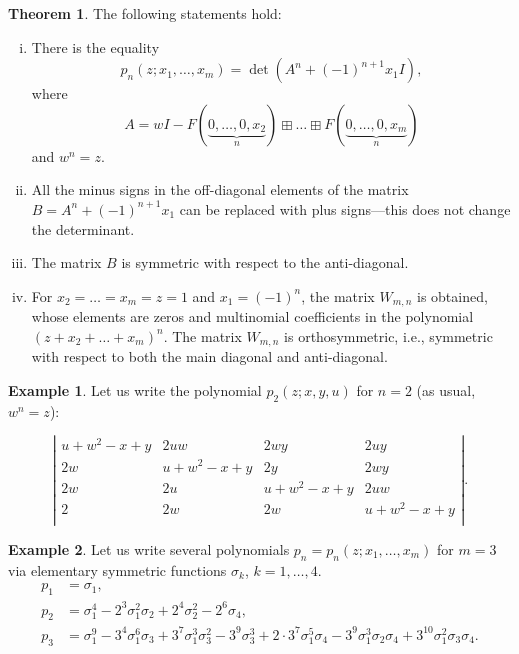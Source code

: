 \documentclass[14pt, dvipsnames]{extarticle}
\theoremstyle{definition}
\newtheorem{theorem}{Theorem}
\theoremstyle{definition}
\newtheorem{example}{\bf Example}
\theoremstyle{remark}
\begin{document}
\begin{theorem}\label{p_n_via_A^n}
The following statements hold:

\begin{enumerate}[(i)]

\item There is the equality $$p_n(z; x_1, \dots, x_m) = \det(A^n + (-1)^{n+1}x_1I),$$ where $$A = wI - F(\underset{n}{\underbrace{0,\dots,0, x_2}})\boxplus \dots\boxplus F(\underset{n}{\underbrace{0,\dots,0, x_m}})$$ and $w^n = z$. 

\item All the minus signs in the off-diagonal elements of the matrix $B = A^n + (-1)^{n+1}x_1$ can be replaced with plus signs—this does not change the determinant.

\item The matrix $B$ is symmetric with respect to the anti-diagonal.

\item For $x_2 = \dots = x_m = z = 1$ and $x_1 = (-1)^n$, the matrix $W_{m, n}$ is obtained, whose elements are zeros and multinomial coefficients in the polynomial $(z + x_2 + \dots + x_m)^n$. The matrix $W_{m,n}$ is orthosymmetric, i.e., symmetric with respect to both the main diagonal and anti-diagonal.

\end{enumerate}
 
\end{theorem} 


\begin{example}
Let us write the polynomial $p_2(z; x, y, u)$ for $n = 2$ (as usual, $w^n = z$):

$$
\left|
\begin{array}{cccc}
 u+w^2-x+y & 2 u w & 2 w y & 2 u y \\
 2 w & u+w^2-x+y & 2 y & 2 w y \\
 2 w & 2 u & u+w^2-x+y & 2 u w \\
 2 & 2 w & 2 w & u+w^2-x+y \\
\end{array}
\right|.
$$

\end{example}

\begin{example}
Let us write several polynomials $p_n = p_n(z; x_1, \dots, x_m)$ for $m = 3$ via elementary symmetric functions $\sigma_k$, $k = 1, \dots, 4$. 
\begin{align*} 
p_1 &= \sigma_1, \\ 
p_2 &= \sigma_1^4 - 2^3 \sigma_1^2 \sigma_2 + 2^4 \sigma_2^2 - 2^6 \sigma_4, \\ 
p_3 &= \sigma_1^9 - 3^4 \sigma_1^6 \sigma_3 + 3^7 \sigma_1^3 \sigma_3^2 - 3^9\sigma_3^3 + 2\cdot 3^7 \sigma_1^5 \sigma_4 - 3^9 \sigma_1^3 \sigma_2 \sigma_4 + 3^{10} \sigma_1^2 \sigma_3 \sigma_4.
\end{align*}

\end{example}
\end{document}
